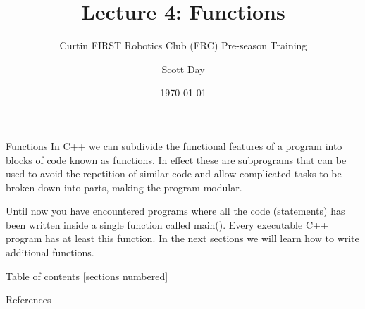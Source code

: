 \documentclass[9pt]{beamer}              %
\title{Lecture 4: Functions}
\subtitle{Curtin FIRST Robotics Club (FRC) Pre-season Training}
\date{\today}
\author{Scott Day}
\institute{Curtin University}
\begin{document}


\maketitle


\begin{frame}[fragile]{Functions}
    In C++ we can subdivide the functional features of a program into blocks of code known as
    functions. In effect these are subprograms that can be used to avoid the repetition of similar
    code and allow complicated tasks to be broken down into parts, making the program modular. \newline

    Until now you have encountered programs where all the code (statements) has been written inside
    a single function called main(). Every executable C++ program has at least this function. In
    the next sections we will learn how to write additional functions.
\end{frame}

\begin{frame}{Table of contents}
  [sections numbered]
  \tableofcontents[hideallsubsections]
\end{frame}













\begin{frame}[allowframebreaks]{References}
  
  
\end{frame}

\end{document}
